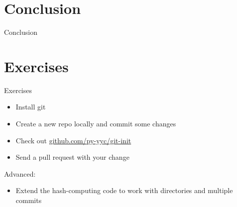 \documentclass[xcolor=svgnames,17pt]{beamer}
\begin{document}
\section{Conclusion}

\begin{frame}{Conclusion}
\end{frame}

\section{Exercises}

\begin{frame}{Exercises}
\begin{itemize}
\item Install git
\item Create a new repo locally and commit some changes
\item Check out \href{https://github.com/py-yyc/git-init}{github.com/py-yyc/git-init}
\item Send a pull request with your change
\end{itemize}
Advanced:
\begin{itemize}
\item Extend the hash-computing code to work with directories and multiple
commits
\end{itemize}
\end{frame}
\end{document}
